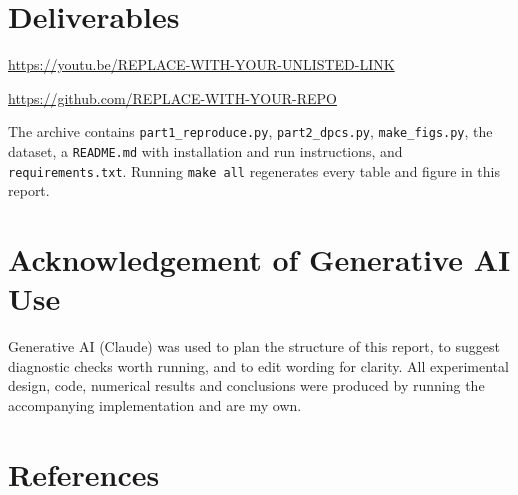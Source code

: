 \documentclass[11pt,a4paper]{article}
\begin{document}
\section*{Deliverables}
\begin{description}[leftmargin=0pt,itemsep=1pt,topsep=2pt,font=\bfseries]
\item[Video presentation] \url{https://youtu.be/REPLACE-WITH-YOUR-UNLISTED-LINK}
\item[Code and data] \url{https://github.com/REPLACE-WITH-YOUR-REPO}
\end{description}
The archive contains \texttt{part1\_reproduce.py}, \texttt{part2\_dpcs.py},
\texttt{make\_figs.py}, the dataset, a \texttt{README.md} with installation and
run instructions, and \texttt{requirements.txt}. Running \texttt{make all}
regenerates every table and figure in this report.

\section*{Acknowledgement of Generative AI Use}
Generative AI (Claude) was used to plan the structure of this report, to suggest
diagnostic checks worth running, and to edit wording for clarity. All
experimental design, code, numerical results and conclusions were produced by
running the accompanying implementation and are my own.


\section*{References}
\end{document}
